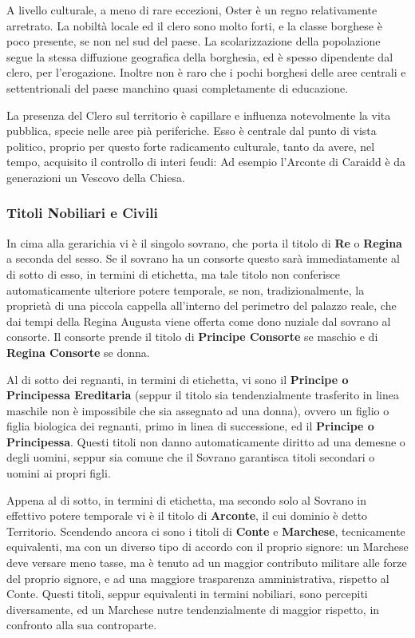 A livello culturale, a meno di rare eccezioni, Oster è un regno relativamente arretrato. La nobiltà locale ed il clero sono molto forti, e la classe borghese è poco presente, se non nel sud del paese.
La scolarizzazione della popolazione segue la stessa diffuzione geografica della borghesia, ed è spesso dipendente dal clero, per l'erogazione. Inoltre non è raro che i pochi borghesi delle aree centrali e settentrionali del paese manchino quasi completamente di educazione.

La presenza del Clero sul territorio è capillare e influenza notevolmente la vita pubblica, specie nelle aree pià periferiche. Esso è centrale dal punto di vista politico, proprio per questo forte radicamento culturale, tanto da avere, nel tempo, acquisito il controllo di interi feudi: Ad esempio l'Arconte di Caraidd è da generazioni un Vescovo della Chiesa.

\subsubsection{Titoli Nobiliari e Civili }
In cima alla gerarichia vi è il singolo sovrano, che porta il titolo di \textbf{Re} o \textbf{Regina} a seconda del sesso. Se il sovrano ha un consorte questo sarà immediatamente al di sotto di esso, in termini di etichetta, ma tale titolo non conferisce automaticamente ulteriore potere temporale, se non, tradizionalmente, la proprietà di una piccola cappella all'interno del perimetro del palazzo reale, che dai tempi della Regina Augusta viene offerta come dono nuziale dal sovrano al consorte.
Il consorte prende il titolo di \textbf{Principe Consorte} se maschio e di \textbf{Regina Consorte} se donna.

Al di sotto dei regnanti, in termini di etichetta, vi sono il \textbf{Principe o Principessa Ereditaria} (seppur il titolo sia tendenzialmente trasferito in linea maschile non è impossibile che sia assegnato ad una donna), ovvero un figlio o figlia biologica dei regnanti, primo in linea di successione, ed il \textbf{Principe o Principessa}. Questi titoli non danno automaticamente diritto ad una demesne o degli uomini, seppur sia comune che il Sovrano garantisca titoli secondari o uomini ai propri figli.

Appena al di sotto, in termini di etichetta, ma secondo solo al Sovrano in effettivo potere temporale vi è il titolo di \textbf{Arconte}, il cui dominio è detto Territorio. Scendendo ancora ci sono i titoli di \textbf{Conte} e \textbf{Marchese}, tecnicamente equivalenti, ma con un diverso tipo di accordo con il proprio signore: un Marchese deve versare meno tasse, ma è tenuto ad un maggior contributo militare alle forze del proprio signore, e ad una maggiore trasparenza amministrativa, rispetto al Conte. Questi titoli, seppur equivalenti in termini nobiliari, sono percepiti diversamente, ed un Marchese nutre tendenzialmente di maggior rispetto, in confronto alla sua controparte.

